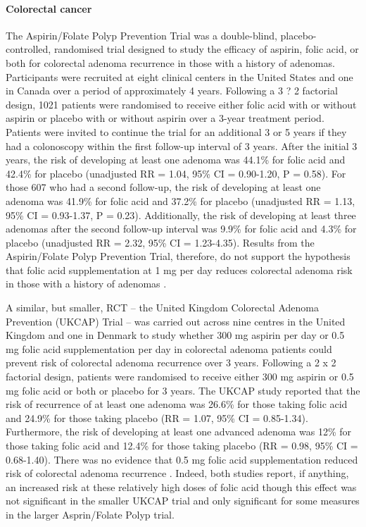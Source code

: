 \paragraph{Colorectal cancer} %
The Aspirin/Folate Polyp Prevention Trial was a double-blind, placebo-controlled, randomised trial designed to study the efficacy of aspirin, folic acid, or both for colorectal adenoma recurrence in those with a history of adenomas. Participants were recruited at eight clinical centers in the United States and one in Canada over a period of approximately 4 years. Following a 3 ? 2 factorial design, 1021 patients were randomised to receive either folic acid with or without aspirin or placebo with or without aspirin over a 3-year treatment period. Patients were invited to continue the trial for an additional 3 or 5 years if they had a colonoscopy within the first follow-up interval of 3 years. After the initial 3 years, the risk of developing at least one adenoma was 44.1\% for folic acid and 42.4\% for placebo (unadjusted RR = 1.04, 95\% CI = 0.90-1.20, P = 0.58). For those 607 who had a second follow-up, the risk of developing at least one adenoma was 41.9\% for folic acid and 37.2\% for placebo (unadjusted 
RR = 1.13, 95\% CI = 0.93-1.37, P = 0.23). Additionally, the risk of developing at least three adenomas after the second follow-up interval was 9.9\% for folic acid and 4.3\% for placebo (unadjusted RR = 2.32, 95\% CI = 1.23-4.35). Results from the Aspirin/Folate Polyp Prevention Trial, therefore, do not support the hypothesis that folic acid supplementation at 1 mg per day reduces colorectal adenoma risk in those with a history of adenomas \cite{c238}. 
 
\noindent A similar, but smaller, RCT -- the United Kingdom Colorectal Adenoma Prevention (UKCAP) Trial -- was carried out across nine centres in the United Kingdom and one in Denmark to study whether 300 mg aspirin per day or 0.5 mg folic acid supplementation per day in colorectal adenoma patients could prevent risk of colorectal adenoma recurrence over 3 years. Following a 2 x 2 factorial design, patients were randomised to receive either 300 mg aspirin or 0.5 mg folic acid or both or placebo for 3 years. The UKCAP study reported that the risk of recurrence of at least one adenoma was 26.6\% for those taking folic acid and 24.9\% for those taking placebo (RR = 1.07, 95\% CI = 0.85-1.34). Furthermore, the risk of developing at least one advanced adenoma was 12\% for those taking folic acid and 12.4\% for those taking placebo (RR = 0.98, 95\% CI = 0.68-1.40). There was no evidence that 0.5 mg folic acid supplementation reduced risk of colorectal adenoma recurrence \cite{c239}. Indeed, both studies report, if 
anything, an increased risk at these relatively high doses of folic acid though this effect was not significant in the smaller UKCAP trial and only significant for some measures in the larger Asprin/Folate Polyp trial. 
 
